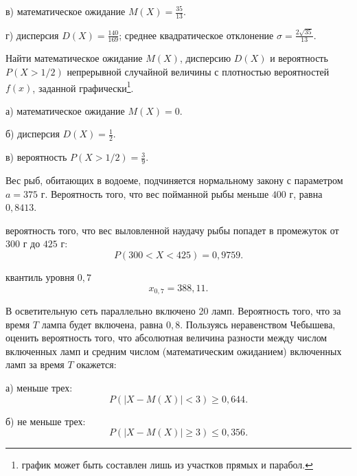 \documentclass[14pt,a4paper,%
]{scrartcl}
\begin{document}
\begin{zkrPlain}{25}
\par  в) математическое ожидание $M(X) = \frac{35}{13}$.

\par  г) дисперсия $D(X) = \frac{140}{169}$; 
среднее квадратическое отклонение $\sigma = \frac{2\sqrt{35}}{13}$. 

\end{zkrPlain}

\newpage


\begin{zkrPlain}{25} Найти математическое ожидание $M(X)$, дисперсию $D(X)$ и вероятность $P(X>1/2)$ непрерывной случайной величины с плотностью вероятностей $f(x)$, заданной графически\footnote{график может быть составлен лишь из участков прямых и парабол.}. 
\begin{figure}[h!]\centering\small
{}
\end{figure}

а) математическое ожидание $M(X) = 0$.

б) дисперсия $D(X) = \frac{1}{2}$.

в) вероятность $P(X>1/2) = \frac{3}{9}$.

\end{zkrPlain}

\vfil

\begin{zkrPlain}{25} Вес рыб, обитающих в водоеме, подчиняется нормальному закону с параметром $a = 375$ г. Вероятность того, что вес пойманной рыбы меньше $400$ г, равна $0{,}8413$. 

\zzz вероятность того, что вес выловленной наудачу рыбы попадет в промежуток от $300$ г до $425$ г: 
$$P(300<X<425) = 0{,}9759. $$

\zzz квантиль уровня $0{,}7$ 
$$x_{0{,}7} = 388{,}11.$$

\end{zkrPlain}

\vfil


\begin{zkrPlain}{25} В осветительную сеть параллельно включено 20 ламп. Вероятность того, что за время $T$ лампа будет включена, равна $0{,}8$. Пользуясь неравенством Чебышева, оценить вероятность того, что абсолютная величина разности между числом включенных ламп и средним числом (математическим ожиданием) включенных ламп за время $T$ окажется: 

а) меньше трех: $$P\left(|X-M(X)|<3\right) \geqslant 0{,}644.$$

б) не меньше трех: $$P\left(|X-M(X)|\geqslant 3\right) \leqslant 0{,}356.$$


\end{zkrPlain}
\end{document}
